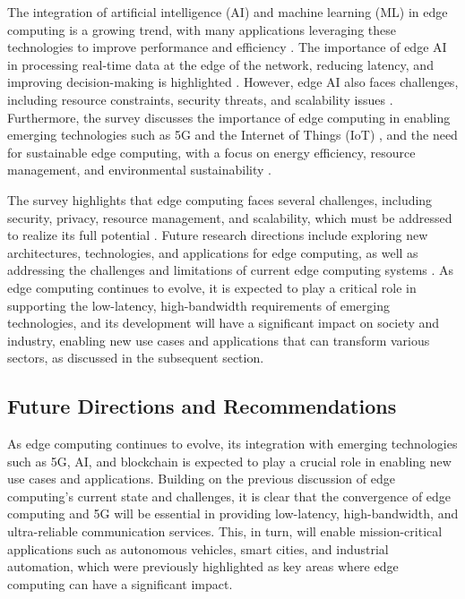 \documentclass[11pt]{article}
\begin{document}
The integration of artificial intelligence (AI) and machine learning (ML) in edge computing is a growing trend, with many applications leveraging these technologies to improve performance and efficiency \cite{ref6}. The importance of edge AI in processing real-time data at the edge of the network, reducing latency, and improving decision-making is highlighted \cite{ref62}. However, edge AI also faces challenges, including resource constraints, security threats, and scalability issues \cite{ref63}. Furthermore, the survey discusses the importance of edge computing in enabling emerging technologies such as 5G and the Internet of Things (IoT) \cite{ref46}, and the need for sustainable edge computing, with a focus on energy efficiency, resource management, and environmental sustainability \cite{ref64}.

The survey highlights that edge computing faces several challenges, including security, privacy, resource management, and scalability, which must be addressed to realize its full potential \cite{ref7}. Future research directions include exploring new architectures, technologies, and applications for edge computing, as well as addressing the challenges and limitations of current edge computing systems \cite{ref65}. As edge computing continues to evolve, it is expected to play a critical role in supporting the low-latency, high-bandwidth requirements of emerging technologies, and its development will have a significant impact on society and industry, enabling new use cases and applications that can transform various sectors, as discussed in the subsequent section.

\subsection{Future Directions and Recommendations}

As edge computing continues to evolve, its integration with emerging technologies such as 5G, AI, and blockchain is expected to play a crucial role in enabling new use cases and applications. Building on the previous discussion of edge computing's current state and challenges, it is clear that the convergence of edge computing and 5G \cite{ref66} will be essential in providing low-latency, high-bandwidth, and ultra-reliable communication services. This, in turn, will enable mission-critical applications such as autonomous vehicles, smart cities, and industrial automation, which were previously highlighted as key areas where edge computing can have a significant impact.
\end{document}

